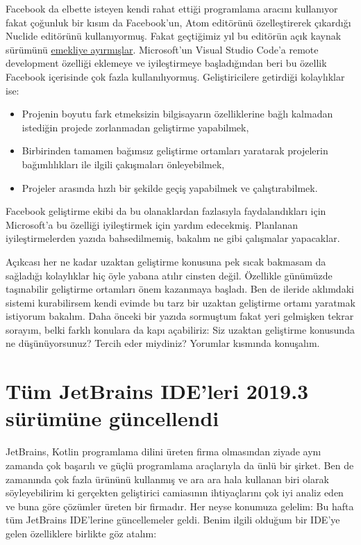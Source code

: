 \documentclass[11pt]{article}
\begin{document}
Facebook da elbette isteyen kendi rahat ettiği programlama aracını kullanıyor
fakat çoğunluk bir kısım da Facebook'un, Atom editörünü özelleştirerek
çıkardığı Nuclide editörünü kullanıyormuş. Fakat geçtiğimiz yıl bu editörün
açık kaynak sürümünü \href{https://nuclide.io/}{emekliye ayırmışlar}. Microsoft'un Visual Studio Code'a
remote development özelliği eklemeye ve iyileştirmeye başladığından beri bu
özellik Facebook içerisinde çok fazla kullanılıyormuş. Geliştiricilere
getirdiği kolaylıklar ise:
\begin{itemize}
\item Projenin boyutu fark etmeksizin bilgisayarın özelliklerine bağlı kalmadan
istediğin projede zorlanmadan geliştirme yapabilmek,
\item Birbirinden tamamen bağımsız geliştirme ortamları yaratarak projelerin
bağımlılıkları ile ilgili çakışmaları önleyebilmek,
\item Projeler arasında hızlı bir şekilde geçiş yapabilmek ve çalıştırabilmek.
\end{itemize}
Facebook geliştirme ekibi da bu olanaklardan fazlasıyla faydalandıkları için
Microsoft'a bu özelliği iyileştirmek için yardım edecekmiş. Planlanan
iyileştirmelerden yazıda bahsedilmemiş, bakalım ne gibi çalışmalar yapacaklar.

Açıkcası her ne kadar uzaktan geliştirme konusuna pek sıcak bakmasam da
sağladığı kolaylıklar hiç öyle yabana atılır cinsten değil. Özellikle günümüzde
taşınabilir geliştirme ortamları önem kazanmaya başladı. Ben de ileride
aklımdaki sistemi kurabilirsem kendi evimde bu tarz bir uzaktan geliştirme
ortamı yaratmak istiyorum bakalım. Daha önceki bir yazıda sormuştum fakat yeri
gelmişken tekrar sorayım, belki farklı konulara da kapı açabiliriz: Siz uzaktan
geliştirme konusunda ne düşünüyorsunuz? Tercih eder miydiniz? Yorumlar kısmında
konuşalım.
\section{Tüm JetBrains IDE'leri 2019.3 sürümüne güncellendi}
\label{sec:org962afca}
JetBrains, Kotlin programlama dilini üreten firma olmasından ziyade aynı
zamanda çok başarılı ve güçlü programlama araçlarıyla da ünlü bir şirket. Ben
de zamanında çok fazla ürününü kullanmış ve ara ara hala kullanan biri olarak
söyleyebilirim ki gerçekten geliştirici camiasının ihtiyaçlarını çok iyi analiz
eden ve buna göre çözümler üreten bir firmadır. Her neyse konumuza gelelim: Bu
hafta tüm JetBrains IDE'lerine güncellemeler geldi. Benim ilgili olduğum bir
IDE'ye gelen özelliklere birlikte göz atalım:
\newpage
\end{document}
